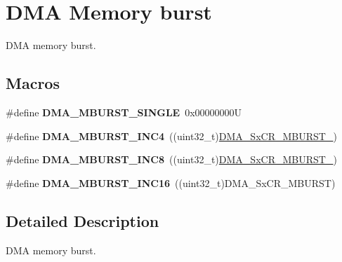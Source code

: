 \hypertarget{group___d_m_a___memory__burst}{}\section{D\+MA Memory burst}
\label{group___d_m_a___memory__burst}


D\+MA memory burst.  


\subsection*{Macros}
\begin{DoxyCompactItemize}
\item 
\mbox{\label{group___d_m_a___memory__burst_ga4e94b7250e6a4f53d702b42b15796953}} 
\#define {\bfseries D\+M\+A\+\_\+\+M\+B\+U\+R\+S\+T\+\_\+\+S\+I\+N\+G\+LE}~0x00000000U
\item 
\mbox{\label{group___d_m_a___memory__burst_gac9efcb13b2f0a715edb931dde213c000}} 
\#define {\bfseries D\+M\+A\+\_\+\+M\+B\+U\+R\+S\+T\+\_\+\+I\+N\+C4}~((uint32\+\_\+t)\mbox{\hyperlink{group___peripheral___registers___bits___definition_ga1e3931a8f14ffe008b8717e1b3232fca}{D\+M\+A\+\_\+\+Sx\+C\+R\+\_\+\+M\+B\+U\+R\+S\+T\+\_}})
\item 
\mbox{\label{group___d_m_a___memory__burst_ga4b8834930bb3b93cd3fcf04660b6933d}} 
\#define {\bfseries D\+M\+A\+\_\+\+M\+B\+U\+R\+S\+T\+\_\+\+I\+N\+C8}~((uint32\+\_\+t)\mbox{\hyperlink{group___peripheral___registers___bits___definition_gaf28eac7212392083bbf1b3d475022b74}{D\+M\+A\+\_\+\+Sx\+C\+R\+\_\+\+M\+B\+U\+R\+S\+T\+\_}})
\item 
\mbox{\label{group___d_m_a___memory__burst_ga7812aea620b09c4f4281d614d86e6094}} 
\#define {\bfseries D\+M\+A\+\_\+\+M\+B\+U\+R\+S\+T\+\_\+\+I\+N\+C16}~((uint32\+\_\+t)D\+M\+A\+\_\+\+Sx\+C\+R\+\_\+\+M\+B\+U\+R\+ST)
\end{DoxyCompactItemize}


\subsection{Detailed Description}
D\+MA memory burst. 

